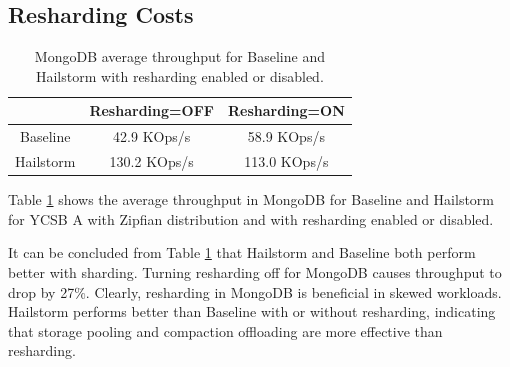 \documentclass[a4paper,10pt,twoside]{article}
\begin{document}
\subsection{Resharding Costs}
\begin{table}
	\centering
	\begin{tabular}{|c|c|c|} %
		\hline 
		&Resharding=OFF&Resharding=ON \\
		\hline  
		Baseline&42.9 KOps/s&58.9 KOps/s \\
		\hline 
		Hailstorm&130.2 KOps/s&113.0 KOps/s \\
		\hline
	\end{tabular}
	\label{table:mesh1}
	\caption{MongoDB average throughput for Baseline and Hailstorm with resharding enabled or disabled. \cite{mainpaper}}
\end{table}
Table \ref{table:mesh1} shows the average throughput in MongoDB for Baseline and Hailstorm for YCSB A with Zipfian distribution and
with resharding enabled or disabled.
\par
It can be concluded from Table \ref{table:mesh1} that Hailstorm and Baseline both perform better with sharding.
Turning resharding off for MongoDB causes throughput to drop by 27$\%$. 
Clearly, resharding in MongoDB is beneficial in skewed workloads.
Hailstorm performs better than Baseline with or without resharding, indicating that storage pooling and compaction offloading are more effective than resharding.

\end{document}
